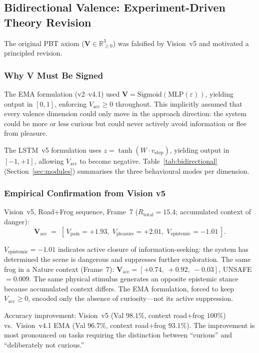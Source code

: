 \documentclass[12pt,a4paper]{article}
\newcommand{\vpain}{V_{\mathrm{pain}}}
\newcommand{\vpleasure}{V_{\mathrm{pleasure}}}
\newcommand{\vepi}{V_{\mathrm{epistemic}}}
\begin{document}
\subsection{Bidirectional Valence: Experiment-Driven Theory Revision}

The original PBT axiom ($\mathbf{V}\in\mathbb{R}^3_{\ge 0}$) was falsified
by Vision~v5 and motivated a principled revision.

\subsubsection{Why V Must Be Signed}

The EMA formulation (v2--v4.1) used
$\mathbf{V} = \mathrm{Sigmoid}(\mathrm{MLP}(\varepsilon))$, yielding output
in $[0,1]$, enforcing $V_{\mathrm{acc}}\ge 0$ throughout. This implicitly
assumed that every valence dimension could only move in the approach direction:
the system could be more or less curious but could never actively avoid
information or flee from pleasure.

The LSTM~v5 formulation uses $z = \tanh(W\cdot v_{\mathrm{step}})$, yielding
output in $[-1,+1]$, allowing $V_{\mathrm{acc}}$ to become negative.
Table~\ref{tab:bidirectional} (Section~\ref{sec:modules}) summarises the
three behavioural modes per dimension.

\subsubsection{Empirical Confirmation from Vision v5}

Vision~v5, Road+Frog sequence, Frame~7 ($R_{\mathrm{total}} = 15.4$;
accumulated context of danger):
\begin{equation}
  \mathbf{V}_{\mathrm{acc}} \;=\;
  [\,\vpain = +1.93,\;\vpleasure = +2.01,\;\vepi = -1.01\,].
\end{equation}

$\vepi = -1.01$ indicates active closure of information-seeking: the system
has determined the scene is dangerous and suppresses further exploration.
The same frog in a Nature context (Frame~7):
$\mathbf{V}_{\mathrm{acc}} = [+0.74,\;+0.92,\;-0.03]$, UNSAFE $= 0.009$.
The same physical stimulus generates an opposite epistemic stance because
accumulated context differs. The EMA formulation, forced to keep
$V_{\mathrm{acc}}\ge 0$, encoded only the absence of curiosity---not its
active suppression.

Accuracy improvement: Vision~v5 (Val $98.1\%$, context road+frog $100\%$)
vs.\ Vision~v4.1 EMA (Val $96.7\%$, context road+frog $93.1\%$). The
improvement is most pronounced on tasks requiring the distinction between
``curious'' and ``deliberately not curious.''
\end{document}
